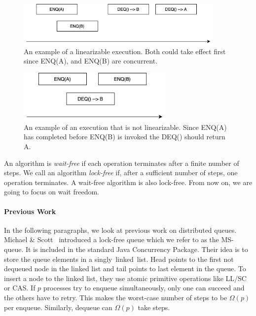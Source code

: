 \documentclass[12pt]{article}
\begin{document}
\begin{figure}[hbt]
  \center\includegraphics[width=4in]{pics/good}
  \caption{An example of a linearizable execution. Both could take effect first since ENQ(A), and ENQ(B) are concurrent.}
\end{figure}

\begin{figure}[hbt]
  \center\includegraphics[width=3in]{pics/bad}
  \caption{An example of an execution that is not linearizable. Since ENQ(A) has completed before ENQ(B) is invoked the DEQ() should return A.}
\end{figure}


An algorithm is \textit{wait-free} if each operation terminates after a finite number of steps. We call an algorithm \textit{lock-free} if, after a sufficient number of steps, one operation terminates. A wait-free algorithm is also lock-free. From now on, we are going to focus on wait freedom.


\paragraph{Previous Work}

In the following paragraphs, we look at previous work on distributed queues.
Michael \& Scott~\cite{DBLP:conf/podc/MichaelS96} introduced a lock-free queue which we refer to as the MS-queue. It is included in the standard Java Concurrency Package. Their idea is to store the queue elements in a singly~linked~list. Head points to the first not dequeued node in the linked list and tail points to last element in the queue. To insert a node to the linked list, they use atomic primitive operations like LL/SC or CAS. If $p$ processes try to enqueue simultaneously, only one can succeed and the others have to retry. This makes the worst-case number of steps to be $\Omega(p)$ per enqueue. Similarly, dequeue can $\Omega(p)$ take steps.
\end{document}
